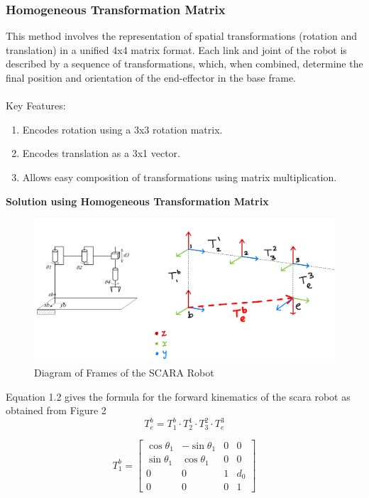 \documentclass[12pt]{report}
\begin{document}
\subsubsection{Homogeneous Transformation Matrix} This method involves the representation of spatial transformations (rotation and translation) in a unified 4x4 matrix format. Each link and joint of the robot is described by a sequence of transformations, which, when combined, determine the final position and orientation of the end-effector in the base frame.
\\\\Key Features:
\begin{enumerate}
	\item Encodes rotation using a 3x3 rotation matrix.
	\item Encodes translation as a 3x1 vector.
	\item Allows easy composition of transformations using matrix multiplication.
\end{enumerate}
\newpage
{\fontsize{12}{20}\selectfont \textbf{Solution using Homogeneous Transformation Matrix}}
\begin{figure}[H]
	\centering
	\includegraphics[scale=0.25]{001} %
	\caption{Diagram of Frames of the SCARA Robot}
\end{figure}


Equation 1.2 gives the formula for the forward kinematics of the scara robot as obtained from Figure 2
	\begin{equation} 
	T^b_e = T^b_1\cdot T^1_2\cdot T^2_3\cdot T^3_e 
\end{equation}


\begin{equation}
	T_1^b=\left[\begin{array}{cccc}
		\cos \theta_1 & -\sin \theta_1 & 0 & 0 \\
		\sin \theta_1 & \cos \theta_1 & 0 & 0 \\
		0 & 0 & 1 & d_0 \\
		0 & 0 & 0 & 1
	\end{array}\right]
\end{equation}
\end{document}
